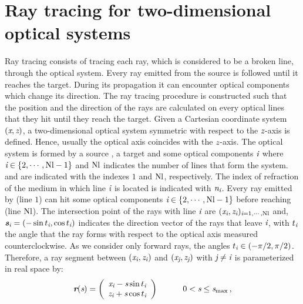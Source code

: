 \section{Ray tracing for two-dimensional optical systems}\label{sec:raytracing}
Ray tracing consists of tracing each ray, which is considered to be a broken line, through the optical system. 
Every ray emitted from the source is followed until it reaches the target. During its propagation it can encounter optical components which change its direction. The ray tracing procedure is constructed such that the position and the direction of the rays are calculated on every optical lines that they hit until they reach the target.
Given a Cartesian coordinate system $(\textit{x}, \textit{z})$, a two-dimensional optical system symmetric with respect to the $\textit{z}$-axis is defined.
Hence, usually the optical axis coincides with the $\textit{z}$-axis.
The optical system is formed by a source , a target   and some optical components $\textit{i}$ where $\textit{i} \in \{2, \cdots, \textrm{Nl}-1\}$ and $\textrm{Nl}$
 indicates the number of lines that form the system.  and  are indicated with the indexes $1$ and $\textrm{Nl}$, respectively.
The index of refraction of the medium in which line $\textit{i}$ is located is indicated with $\textit{n}_{\textit{i}}$.
Every ray emitted by  (line $1$) can hit some optical components $\textit{i}\in\{2, \cdots, \textrm{Nl} -1\}$ before reaching  (line $\textrm{Nl}$).
The intersection point of the rays with line $\textit{i}$ are $(\textit{x}_{\textit{i}}, \textit{z}_{\textit{i}})_{\textit{i} =1, \cdots, \textrm{Nl}}$ and, $\textit{\textbf{s}}_{\textit{i}}= (-\sin t_{\textit{i}}, \cos t_{\textit{i}})$ indicates the direction vector of the rays that leave $\textit{i}$,
with $t_{\textit{i}}$ the angle that the ray forms with respect to the optical axis measured counterclockwise. As we consider only forward rays, the angles
$t_{\textit{i}}\in (-\pi/2, \pi/2)$.
Therefore, a ray segment between $(\textit{x}_{\textit{i}}, \textit{z}_{\textit{i}})$ and $(\textit{x}_{\textit{j}}, \textit{z}_{\textit{j}})$
with $\textit{j}\neq\textit{i}$ is parameterized in real space by:
\begin{equation}
\label{parametrization}
\textit{\textbf{r}}(\textit{s})=
\left( \begin{array}{cc}
\textit{x}_{\textit{i}}-\textit{s}\sin t_{\textit{i}} \\
\textit{z}_{\textit{i}}+\textit{s}\cos t_{\textit{i}}\end{array} \right) \qquad \quad 0< \textit{s}\leq \textit{s}_{\textrm{max}}\,,
\end{equation}
